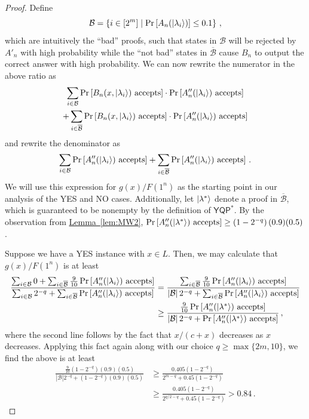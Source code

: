 \documentclass[11pt]{article}
\numberwithin{equation}{section}
\theoremstyle{definition}
\theoremstyle{plain}
\newcommand{\expref}[2]{\hyperref[#2]{#1~\ref{#2}}}
\newcommand{\class}[1]{\ensuremath{\mathsf{#1}}\xspace}
\newcommand{\YQPstar}{\class{YQP^*}}
\newcommand{\calB}{\mathcal{B}}
\newcommand{\abs}[1]{\left\lvert #1 \right\rvert}
\begin{document}
\begin{proof}
	Define
	\[
	\calB = \left\{ i\in[2^m] \mid \Pr\left[A_n(\ket{\lambda_i})\right]
	\leq 0.1 \right\} \, ,
	\]
	which are intuitively the ``bad'' proofs, such that states in $\calB$ will be rejected
	by $A'_n$ with high probability while the ``not bad'' states in $\overline{\calB}$
	cause $B_n$ to output the correct answer with high probability.
%
%
%
%
%
%
%
%
%
%
%
%
%
%
%
%
%
%
%
%
%
%
%
%
%
%
%
%
%
	We can now rewrite the numerator in the above ratio as
	\begin{multline*}
		\sum_{i\in \calB}
		\Pr\left[B_n(x,\ket{\lambda_i})\text{ accepts}\right]
		\cdot \Pr\left[A''_n(\ket{\lambda_i})\text{ accepts}\right] 
		\\ + 
		\sum_{i\in\overline{\calB}} 
		\Pr\left[B_n(x,\ket{\lambda_i})\text{ accepts}\right]
		\cdot \Pr\left[A''_n(\ket{\lambda_i})\text{ accepts}\right] 
	\end{multline*}
	and rewrite the denominator as
	\[
		\sum_{i\in \calB} \Pr\left[A''_n(\ket{\lambda_i})\text{ accepts}\right]
		+ \sum_{i\in\overline{\calB}} \Pr\left[A''_n(\ket{\lambda_i})\text{ accepts}\right]
		\, .
	\]
	We will use this expression for $g(x)/F(1^n)$ as the starting point in our analysis of the
	YES and NO cases.
	Additionally, let $\ket{\lambda^*}$ denote a proof in $\overline{\calB}$,
	which is guaranteed to be nonempty by the definition of $\YQPstar$.
	By the observation from \expref{Lemma}{lem:MW2},
	$\Pr\left[A''_n(\ket{\lambda^*})\text{ accepts}\right] \geq \left(1-2^{-q}\right) (0.9)(0.5)$.
%
	
	Suppose we have a YES instance with $x\in L$.
	Then, we may calculate that $g(x)/F(1^n)$ is at least
	\begin{align*}
		\frac{
			\sum_{i\in \calB} 0
			+ \sum_{i\in\overline{\calB}} \frac{9}{10}
			\Pr\left[A''_n(\ket{\lambda_i})\text{ accepts}\right]
		}
		{
			\sum_{i\in \calB} 2^{-q}
			+ \sum_{i\in\overline{\calB}}
			\Pr\left[A''_n(\ket{\lambda_i})\text{ accepts}\right]
		}
		&= \frac{
			\sum_{i\in\overline{\calB}} \frac{9}{10}
			\Pr\left[A''_n(\ket{\lambda_i})\text{ accepts}\right]
		}
		{
			\abs{\calB} 2^{-q}
			+ \sum_{i\in\overline{\calB}} \Pr\left[A''_n(\ket{\lambda_i})\text{ accepts}\right]
		} \\
		&\geq \frac{\frac{9}{10} \Pr\left[A''_n(\ket{\lambda^*})\text{ accepts}\right]}
		{ \abs{\calB} 2^{-q} + \Pr\left[A''_n(\ket{\lambda^*})\text{ accepts}\right]} \, ,
	\end{align*}
	where the second line follows by the fact that $x/(c+x)$ decreases as $x$ decreases.
	Applying this fact again along with our choice $q\geq\max\{2m,10\}$, we find
	the above is at least
	\begin{align*}
		\frac{\frac{9}{10}(1-2^{-q}) (0.9)(0.5) }
		{\abs{\calB}2^{-q} + (1-2^{-q}) (0.9)(0.5)}
		&\geq \frac{ 0.405 (1-2^{-q}) }{2^{m-q} + 0.45(1-2^{-q}) } \\
		&\geq \frac{0.405(1-2^{-q}) }{2^{q/2-q} + 0.45(1-2^{-q}) } > 0.84 \, .
	\end{align*}
	

\end{proof}
\end{document}
